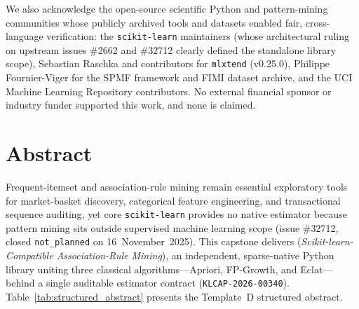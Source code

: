 We also acknowledge the open-source scientific Python and pattern-mining communities whose publicly archived tools and datasets enabled fair, cross-language verification: the \texttt{scikit-learn} maintainers (whose architectural ruling on upstream issues \#2662 and \#32712 clearly defined the standalone library scope), Sebastian Raschka and contributors for \texttt{mlxtend} (v0.25.0), Philippe Fournier-Viger for the SPMF framework and FIMI dataset archive, and the UCI Machine Learning Repository contributors. No external financial sponsor or industry funder supported this work, and none is claimed.

\newpage
\chapter*{Abstract}

\vspace{-3mm}
\begingroup
\fontsize{11}{14.5}\selectfont
Frequent-itemset and association-rule mining remain essential exploratory tools for market-basket discovery, categorical feature engineering, and transactional sequence auditing, yet core \texttt{scikit-learn} provides no native estimator because pattern mining sits outside supervised machine learning scope (issue \#32712, closed \texttt{not\_\protect\allowbreak{}planned} on 16~November~2025). This capstone delivers \skarm (\emph{Scikit-learn-Compatible Association-Rule Mining}), an independent, sparse-native Python library uniting three classical algorithms---Apriori, FP-Growth, and Eclat---behind a single auditable estimator contract (\texttt{KLCAP-2026-00340}). Table~\ref{tab:structured_abstract} presents the Template~D structured abstract.
\endgroup

